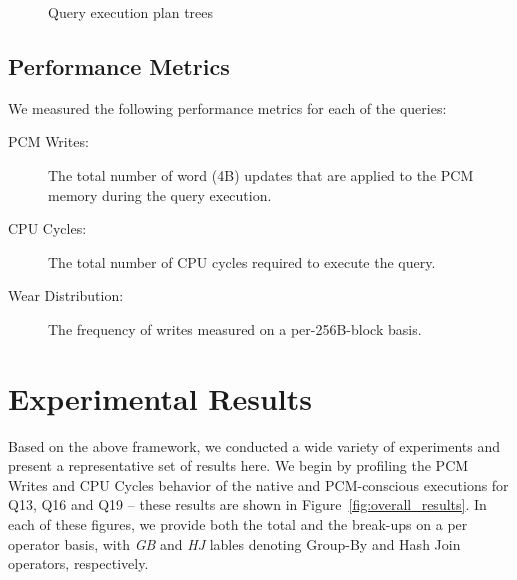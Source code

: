 \begin{figure*}[t]
{
}

\caption{ Query execution plan trees}

\label{fig:plan_trees}

\end{figure*}




\subsection{Performance Metrics}
We measured the following performance metrics for each of the queries:
\begin{description}


\item [PCM Writes:] The total number of word (4B) updates that are applied to the PCM memory during
the query execution.
\item [CPU Cycles:] The total number of CPU cycles required to execute the query.
\item [Wear Distribution:] The frequency of writes measured on a per-256B-block basis.

\end{description}

\section{Experimental Results}
\label{sec:results}
Based on the above framework, we conducted a wide variety of experiments
and present a representative set of results here.  We begin by profiling the PCM Writes and CPU Cycles behavior of
the native and PCM-conscious executions for Q13, Q16 and Q19 --
these results are shown in Figure~\ref{fig:overall_results}.  In each of these figures, we provide both the total and
the break-ups on a per operator basis, with \emph{GB} and \emph{HJ} lables denoting Group-By and Hash Join operators, respectively.

